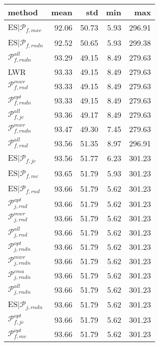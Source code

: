 \begin{tabular}{|@{}l@{}|@{}r@{}|@{}r@{}|@{}r@{}|@{}r@{}|}\hline
method & mean & std & min & max \\ \hline\hline
ES\boldmath$|{\mathcal{P}_{f,mxc}}$ &  92.06 &  50.73 &  5.93 &  296.91  \\ 
ES$|{\mathcal{P}_{f,rndn}}$ &  92.52 &  50.65 &  5.93 &  299.38  \\ 
${\mathcal{P}_{f,rndn}^{all}}$ &  93.29 &  49.15 &  8.49 &  279.63  \\ 
LWR &  93.33 &  49.15 &  8.49 &  279.63  \\ 
${\mathcal{P}_{f,rnd}^{mwr}}$ &  93.33 &  49.15 &  8.49 &  279.63  \\ 
${\mathcal{P}_{f,rndn}^{opt}}$ &  93.33 &  49.15 &  8.49 &  279.63  \\ 
${\mathcal{P}_{f,jc}^{all}}$ &  93.36 &  49.17 &  8.49 &  279.63  \\ 
${\mathcal{P}_{f,rndn}^{mwr}}$ &  93.47 &  49.30 &  7.45 &  279.63  \\ 
${\mathcal{P}_{f,rnd}^{all}}$ &  93.56 &  51.35 &  8.97 &  296.91  \\ 
ES$|{\mathcal{P}_{f,jc}}$ &  93.56 &  51.77 &  6.23 &  301.23  \\ 
ES$|{\mathcal{P}_{f,mc}}$ &  93.65 &  51.79 &  5.93 &  301.23  \\ 
ES$|{\mathcal{P}_{f,rnd}}$ &  93.66 &  51.79 &  5.62 &  301.23  \\ 
${\mathcal{P}_{j,rnd}^{opt}}$ &  93.66 &  51.79 &  5.62 &  301.23  \\ 
${\mathcal{P}_{j,rnd}^{mwr}}$ &  93.66 &  51.79 &  5.62 &  301.23  \\ 
${\mathcal{P}_{j,rnd}^{all}}$ &  93.66 &  51.79 &  5.62 &  301.23  \\ 
${\mathcal{P}_{j,rndn}^{opt}}$ &  93.66 &  51.79 &  5.62 &  301.23  \\ 
${\mathcal{P}_{j,rndn}^{mwr}}$ &  93.66 &  51.79 &  5.62 &  301.23  \\ 
${\mathcal{P}_{j,rndn}^{cma}}$ &  93.66 &  51.79 &  5.62 &  301.23  \\ 
${\mathcal{P}_{j,rndn}^{all}}$ &  93.66 &  51.79 &  5.62 &  301.23  \\ 
ES$|{\mathcal{P}_{j,rndn}}$ &  93.66 &  51.79 &  5.62 &  301.23  \\ 
${\mathcal{P}_{f,jc}^{opt}}$ &  93.66 &  51.79 &  5.62 &  301.23  \\ 
${\mathcal{P}_{f,mc}^{opt}}$ &  93.66 &  51.79 &  5.62 &  301.23  \\ 

\end{tabular}
